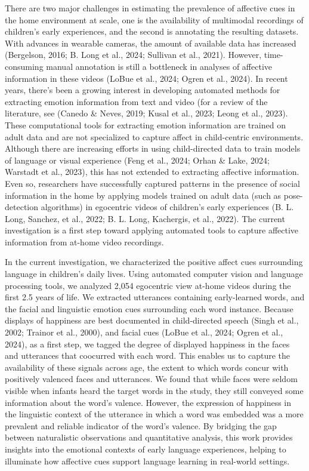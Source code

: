 \documentclass[10pt, letterpaper]{article}
\begin{document}
There are two major challenges in estimating the prevalence of affective
cues in the home environment at scale, one is the availability of
multimodal recordings of children's early experiences, and the second is
annotating the resulting datasets. With advances in wearable cameras,
the amount of available data has increased (Bergelson, 2016; B. Long et
al., 2024; Sullivan et al., 2021). However, time-consuming manual
annotation is still a bottleneck in analyses of affective information in
these videos (LoBue et al., 2024; Ogren et al., 2024). In recent years,
there's been a growing interest in developing automated methods for
extracting emotion information from text and video (for a review of the
literature, see (Canedo \& Neves, 2019; Kusal et al., 2023; Leong et
al., 2023). These computational tools for extracting emotion information
are trained on adult data and are not specialized to capture affect in
child-centric environments. Although there are increasing efforts in
using child-directed data to train models of language or visual
experience (Feng et al., 2024; Orhan \& Lake, 2024; Warstadt et al.,
2023), this has not extended to extracting affective information. Even
so, researchers have successfully captured patterns in the presence of
social information in the home by applying models trained on adult data
(such as pose-detection algorithms) in egocentric videos of children's
early experiences (B. L. Long, Sanchez, et al., 2022; B. L. Long,
Kachergis, et al., 2022). The current investigation is a first step
toward applying automated tools to capture affective information from
at-home video recordings.

In the current investigation, we characterized the positive affect cues
surrounding language in children's daily lives. Using automated computer
vision and language processing tools, we analyzed 2,054 egocentric view
at-home videos during the first 2.5 years of life. We extracted
utterances containing early-learned words, and the facial and linguistic
emotion cues surrounding each word instance. Because displays of
happiness are best documented in child-directed speech (Singh et al.,
2002; Trainor et al., 2000), and facial cues (LoBue et al., 2024; Ogren
et al., 2024), as a first step, we tagged the degree of displayed
happiness in the faces and utterances that coocurred with each word.
This enables us to capture the availability of these signals across age,
the extent to which words concur with positively valenced faces and
utterances. We found that while faces were seldom visible when infants
heard the target words in the study, they still conveyed some
information about the word's valence. However, the expression of
happiness in the linguistic context of the utterance in which a word was
embedded was a more prevalent and reliable indicator of the word's
valence. By bridging the gap between naturalistic observations and
quantitative analysis, this work provides insights into the emotional
contexts of early language experiences, helping to illuminate how
affective cues support language learning in real-world settings.
\end{document}
